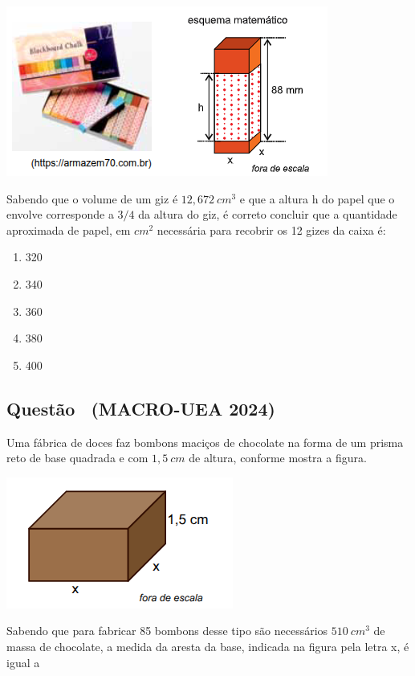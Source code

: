 \documentclass[12pt]{article}
\newif\ifmostravermelho
\newcommand{\vermelho}[1]{%
  \ifmostravermelho
    {\color{red}#1}%
  \else
    #1%
  \fi
}
\newcounter{questao}
\newcommand{\novaquestao}[1]{%
  \stepcounter{questao}%
  \subsection*{Questão \thequestao\ (#1)}%
}
\begin{document}
\begin{multicols}{2}
            \begin{center}
                \includegraphics[scale=0.6]{q4-sis.png}
            \end{center} Sabendo que o volume de um giz é $12,672 \ cm^{3}$ e que a altura h do papel que o envolve corresponde a $3/4$ da altura do giz, é correto concluir que a quantidade aproximada de papel, em $cm^{2}$ necessária para recobrir os 12 gizes da
            caixa é:
        
            \begin{enumerate}[label=(\Alph*), noitemsep]
                \item 320
                \item 340
                \item 360
                \item \vermelho{380} %
                \item 400
            \end{enumerate}

        \novaquestao{MACRO-UEA 2024}
            Uma fábrica de doces faz bombons maciços de chocolate na forma de um prisma reto de base quadrada e com $1,5\ cm$ de altura, conforme mostra a figura.

            \begin{center}
                \includegraphics[scale=0.6]{q24.png}
            \end{center} Sabendo que para fabricar 85 bombons desse tipo são necessários $510\ cm^{3}$ de massa de chocolate, a medida da aresta da base, indicada na figura pela letra x, é igual a
        

\end{multicols}
\end{document}
